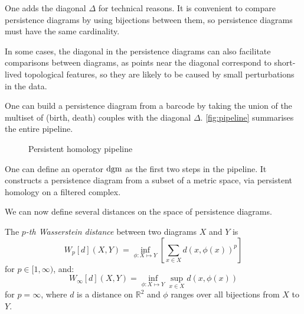 \documentclass[a4paper,11pt,openany,extrafontsizes]{memoir}
\begin{document}
One adds the diagonal $\Delta$ for technical reasons. It is convenient
to compare persistence diagrams by using bijections between them, so
persistence diagrams must have the same cardinality.

In some cases, the diagonal in the persistence diagrams can also
facilitate comparisons between diagrams, as points near the diagonal
correspond to short-lived topological features, so they are likely to
be caused by small perturbations in the data.

One can build a persistence diagram from a barcode by taking the union
of the multiset of (birth, death) couples with the diagonal
$\Delta$. \autoref{fig:pipeline} summarises the entire pipeline.

\begin{figure}[ht]
  \centering

  \caption{Persistent homology pipeline}%
  \label{fig:pipeline}
\end{figure}

One can define an operator $\operatorname{dgm}$ as the first two steps in the
pipeline. It constructs a persistence diagram from a subset of a
metric space, via persistent homology on a filtered complex.

We can now define several distances on the space of persistence
diagrams.

\begin{defn}
  The \emph{$p$-th Wasserstein distance} between two diagrams $X$ and
  $Y$ is
  \[ W_p[d](X, Y) = \inf_{\phi:X\mapsto Y} \left[\sum_{x\in X} {d\left(x, \phi(x)\right)}^p\right] \]
  for $p\in [1,\infty)$, and:
  \[ W_\infty[d](X, Y) = \inf_{\phi:X\mapsto Y} \sup_{x\in X} d\left(x,
      \phi(x)\right) \] for $p = \infty$, where $d$ is a distance on
  $\mathbb{R}^2$ and $\phi$ ranges over all bijections from $X$ to
  $Y$.
\end{defn}
\end{document}
